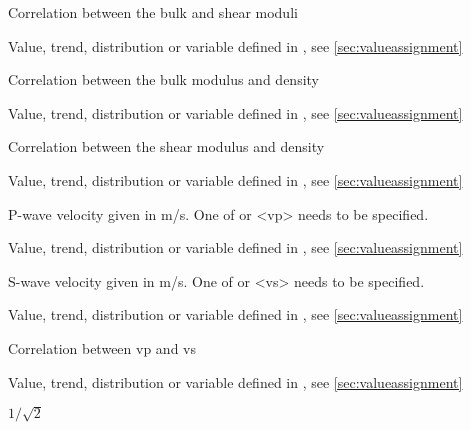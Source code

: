 {
 \slist
   \item \Description Correlation between the bulk and shear moduli
   \item \Argument Value, trend, distribution or variable defined in , see \autoref{sec:valueassignment}
   \item {}
 \elist

 \slist
   \item \Description Correlation between the bulk modulus and density
   \item \Argument Value, trend, distribution or variable defined in , see \autoref{sec:valueassignment}
   \item {}
 \elist

 \slist
   \item \Description Correlation between the shear modulus and density
   \item \Argument Value, trend, distribution or variable defined in , see \autoref{sec:valueassignment}
   \item {}
 \elist

 \slist
   \item \Description P-wave velocity given in m/s. One of  or <vp> needs to be specified.
   \item \Argument Value, trend, distribution or variable defined in , see \autoref{sec:valueassignment}
   \item \Default
 \elist

 \slist
   \item \Description S-wave velocity given in m/s. One of  or <vs> needs to be specified.
   \item \Argument Value, trend, distribution or variable defined in , see \autoref{sec:valueassignment}
   \item \Default
 \elist

 \slist
   \item \Description Correlation between vp and vs
   \item \Argument Value, trend, distribution or variable defined in , see \autoref{sec:valueassignment}
   \item \Default $1/\sqrt{2}$
 \elist

}
